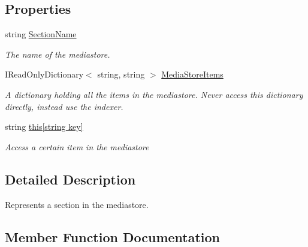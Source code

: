 \subsection*{Properties}
\begin{DoxyCompactItemize}
\item 
string \hyperlink{interface_snowflake_1_1_information_1_1_media_store_1_1_i_media_store_section_ab0d70ad45cbbb8aadf5cd992e6d274d4}{Section\+Name}
\begin{DoxyCompactList}\small\item\em The name of the mediastore. \end{DoxyCompactList}\item 
I\+Read\+Only\+Dictionary$<$ string, string $>$ \hyperlink{interface_snowflake_1_1_information_1_1_media_store_1_1_i_media_store_section_ad756842e38469738145eec216952c9b5}{Media\+Store\+Items}
\begin{DoxyCompactList}\small\item\em A dictionary holding all the items in the mediastore. Never access this dictionary directly, instead use the indexer. \end{DoxyCompactList}\item 
string \hyperlink{interface_snowflake_1_1_information_1_1_media_store_1_1_i_media_store_section_ad878b6801659f539a1482b12e09468f6}{this\mbox{[}string key\mbox{]}}
\begin{DoxyCompactList}\small\item\em Access a certain item in the mediastore \end{DoxyCompactList}\end{DoxyCompactItemize}


\subsection{Detailed Description}
Represents a section in the mediastore. 



\subsection{Member Function Documentation}
\hypertarget{interface_snowflake_1_1_information_1_1_media_store_1_1_i_media_store_section_af3dc1bd02ecb2d3338f94651480e4b30}{}
